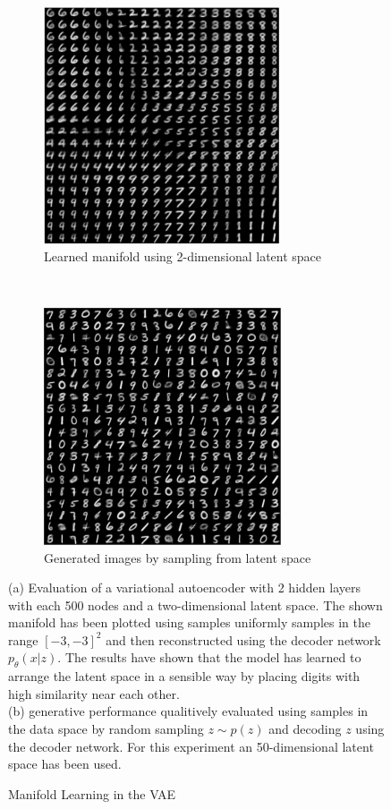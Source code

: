 \begin{figure}[t!]
    \centering
    \begin{subfigure}[t]{0.5\textwidth}
        \centering
        \includegraphics[height=7cm]{media/vae_manifold.pdf}
        \caption{Learned manifold using 2-dimensional latent space}
    \end{subfigure}%
    ~
    \begin{subfigure}[t]{0.5\textwidth}
        \centering
        \includegraphics[height=7cm]{media/vae_samples.pdf}
        \caption{Generated images by sampling from latent space}
    \end{subfigure}
    \caption{Manifold Learning in the VAE}
    \label{fig:vae_experiments}
    \medskip
    \small
    (a) Evaluation of a variational autoencoder with 2 hidden layers with each 500 nodes and a two-dimensional latent space.
    The shown manifold has been plotted using samples uniformly samples in the range $[-3,-3]^2$ and then reconstructed using the decoder network $p_\theta(x|z)$. The results have shown that the model has learned to arrange the latent space in a sensible way by placing digits with high similarity near each other.\\
    (b) generative performance qualitively evaluated using samples in the data space by random sampling $z \sim p(z)$ and decoding $z$ using the decoder network. For this experiment an 50-dimensional latent space has been used.
\end{figure}

